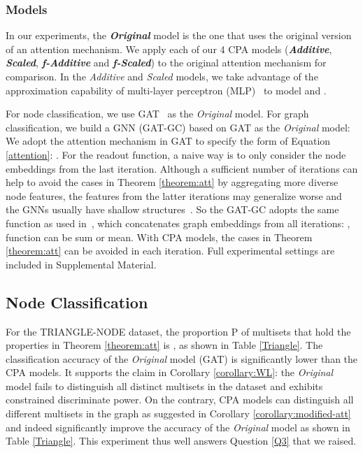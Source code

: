 \documentclass[letterpaper]{article} \usepackage{aaai20}  \usepackage{times}  \usepackage{helvet} \usepackage{courier}  \usepackage[hyphens]{url}  \usepackage{graphicx} \urlstyle{rm} \def\UrlFont{\rm}  \usepackage{graphicx}  \frenchspacing  \setlength{\pdfpagewidth}{8.5in}  \setlength{\pdfpageheight}{11in}
\theoremstyle{plain}
\theoremstyle{definition}
\begin{document}
\subsubsection{Models}
In our experiments, the \textbf {\textit{Original}} model is the one that uses the original version of an attention mechanism. We apply each of our 4 CPA models (\textbf {\textit{Additive}}, \textbf {\textit{Scaled}}, \textbf {\textit{f-Additive}} and \textbf {\textit{f-Scaled}}) to the original attention mechanism for comparison. In the \textit{Additive} and \textit{Scaled} models, we take advantage of the approximation capability of multi-layer perceptron (MLP)~\cite{hornik1989multilayer,hornik1991approximation} to model  and .

For node classification, we use GAT~\cite{velickovic2018graph} as the \textit{Original} model. For graph classification, we build a GNN (GAT-GC) based on GAT as the \textit{Original} model:  We adopt the attention mechanism in GAT to specify the form of Equation \ref{attention}: . For the readout function, a naive way is to only consider the node embeddings from the last iteration. Although a sufficient number of iterations can help to avoid the cases in Theorem \ref{theorem:att} by aggregating more diverse node features, the features from the latter iterations may generalize worse and the GNNs usually have shallow structures~\cite{xu2018how,zhou2018graph}. So the GAT-GC adopts the same function as used in~\cite{xu2018representation,xu2018how,lee2019self,li2019deepgcns}, which concatenates graph embeddings from all iterations: ,  function can be sum or mean. With CPA models, the cases in Theorem \ref{theorem:att} can be avoided in each iteration. Full experimental settings are included in Supplemental Material. 

\subsection{Node Classification}
For the TRIANGLE-NODE dataset, the proportion P of multisets that hold the properties in Theorem \ref{theorem:att} is , as shown in Table \ref{Triangle}. The classification accuracy of the \textit{Original} model (GAT) is significantly lower than the CPA models. It supports the claim in Corollary \ref{corollary:WL}: the \textit{Original} model fails to distinguish all distinct multisets in the dataset and exhibits constrained discriminate power. On the contrary, CPA models can distinguish all different multisets in the graph as suggested in Corollary \ref{corollary:modified-att} and indeed significantly improve the accuracy of the \textit{Original} model as shown in Table \ref{Triangle}. This experiment thus well answers Question \ref{Q3} that we raised.
\end{document}
